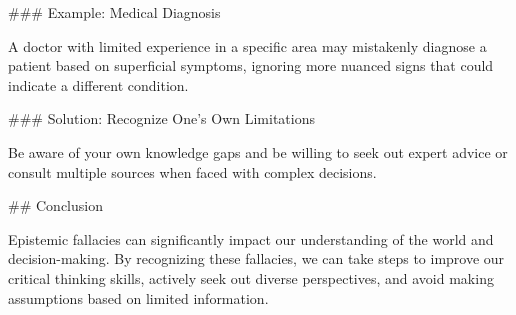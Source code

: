 ### Example: Medical Diagnosis

A doctor with limited experience in a specific area may mistakenly diagnose a patient based on superficial symptoms, ignoring more nuanced signs that could indicate a different condition.

### Solution: Recognize One's Own Limitations

Be aware of your own knowledge gaps and be willing to seek out expert advice or consult multiple sources when faced with complex decisions.

## Conclusion

Epistemic fallacies can significantly impact our understanding of the world and decision-making. By recognizing these fallacies, we can take steps to improve our critical thinking skills, actively seek out diverse perspectives, and avoid making assumptions based on limited information.
